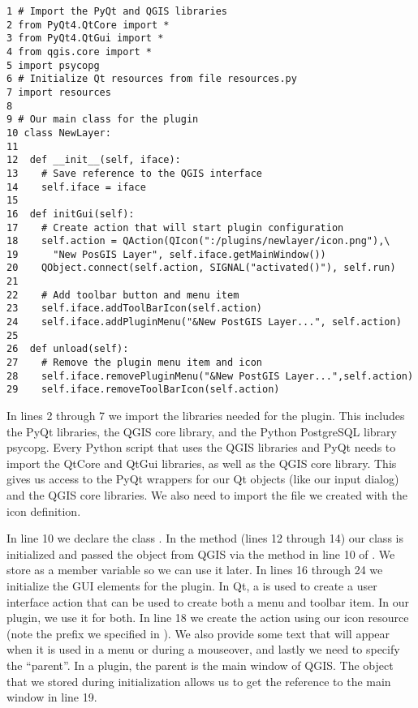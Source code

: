 \begin{verbatim}
1 # Import the PyQt and QGIS libraries
2 from PyQt4.QtCore import *
3 from PyQt4.QtGui import *
4 from qgis.core import *
5 import psycopg
6 # Initialize Qt resources from file resources.py
7 import resources
8
9 # Our main class for the plugin
10 class NewLayer:
11
12  def __init__(self, iface):
13    # Save reference to the QGIS interface
14    self.iface = iface
15
16  def initGui(self):
17    # Create action that will start plugin configuration
18    self.action = QAction(QIcon(":/plugins/newlayer/icon.png"),\
19      "New PosGIS Layer", self.iface.getMainWindow())
20    QObject.connect(self.action, SIGNAL("activated()"), self.run)
21
22    # Add toolbar button and menu item
23    self.iface.addToolBarIcon(self.action)
24    self.iface.addPluginMenu("&New PostGIS Layer...", self.action)
25
26  def unload(self):
27    # Remove the plugin menu item and icon
28    self.iface.removePluginMenu("&New PostGIS Layer...",self.action)
29    self.iface.removeToolBarIcon(self.action)
\end{verbatim}

In lines 2 through 7 we import the libraries needed for the plugin.
This includes the PyQt libraries, the QGIS core library, and the Python PostgreSQL library psycopg.
Every Python script that uses the QGIS libraries and PyQt needs to import the QtCore and QtGui libraries, as well as the QGIS core library.
This gives us access to the PyQt wrappers for our Qt objects (like our input dialog) and the QGIS core libraries.
We also need to import the \filename{resources.py} file we created with the icon definition.

In line 10 we declare the class .
In the  method (lines 12 through 14) our class is initialized and passed the  object from QGIS via the  method in line 10 of .
We store \object{iface} as a member variable so we can use it later.
In lines 16 through 24 we initialize the GUI elements for the plugin.
In Qt, a \classname{QAction} is used to create a user interface action that can be used to create both a menu and toolbar item.
In our plugin, we use it for both.
In line 18 we create the action using our icon resource (note the prefix we specified in ).
We also provide some text that will appear when it is used in a menu or during a mouseover, and lastly we need to specify the ``parent''.
In a plugin, the parent is the main window of QGIS.
The  object that we stored during initialization allows us to get the reference to the main window in line 19.

